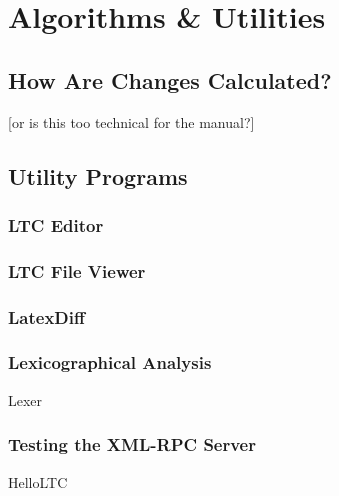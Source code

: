 \chapter{Algorithms \& Utilities}

\section{How Are Changes Calculated?} \label{sec:algorithms}

[or is this too technical for the manual?]

\section{Utility Programs} \label{sec:utils}

\subsection{LTC Editor}

\subsection{LTC File Viewer}

\subsection{LatexDiff}

\subsection{Lexicographical Analysis}
Lexer

\subsection{Testing the XML-RPC Server}

HelloLTC
